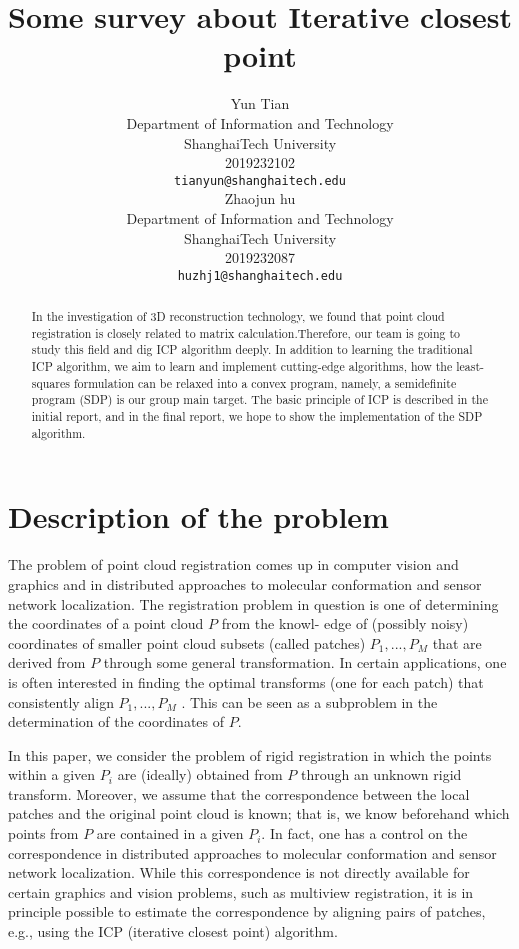 \documentclass{article}
\title{Some survey about Iterative closest point}
\author{
  Yun Tian\\
	Department of Information and Technology\\
	ShanghaiTech University\\
	2019232102\\
  \texttt{tianyun@shanghaitech.edu} \\
   \And
 Zhaojun hu \\
  Department of Information and Technology\\
  ShanghaiTech University\\
2019232087\\
  \texttt{huzhj1@shanghaitech.edu} \\
}
\begin{document}
\maketitle

\begin{abstract}
In the investigation of 3D reconstruction technology, we found that point cloud registration is closely related to matrix calculation.Therefore, our team is going to study this field and dig ICP algorithm deeply. In addition to learning the traditional ICP algorithm, we aim to learn and implement cutting-edge algorithms, how the least-squares formulation can be relaxed into a convex program, namely, a semidefinite program (SDP) is our group main target. The basic principle of ICP is described in the initial report, and in the final report, we hope to show the implementation of the SDP algorithm.
\end{abstract}


\section{Description of the problem}
The problem of point cloud registration comes up in computer vision and graphics and in distributed approaches to molecular conformation  and sensor network localization. The registration problem in question is one of determining the coordinates of a point cloud $P$ from the knowl- edge of (possibly noisy) coordinates of smaller point cloud subsets (called patches) $P_1 , . . . , P_M$ that are derived from $P$ through some general transformation. In certain applications, one is often interested in finding the optimal transforms (one for each patch) that consistently align $P_1, . . . , P_M$ . This can be seen as a subproblem in the determination of the coordinates of $P$.

In this paper, we consider the problem of rigid registration in which the points within a given $P_i$ are (ideally) obtained from $P$ through an unknown rigid transform. Moreover, we assume that the correspondence between the local patches and the original point cloud is known; that is, we know beforehand which points from $P$ are contained in a given $P_i$. In fact, one has a control on the correspondence in distributed approaches to molecular conformation and sensor network localization. While this correspondence is not directly available for certain graphics and vision problems, such as multiview registration, it is in principle possible to estimate the correspondence by aligning pairs of patches, e.g., using the ICP (iterative closest point) algorithm.
\end{document}
